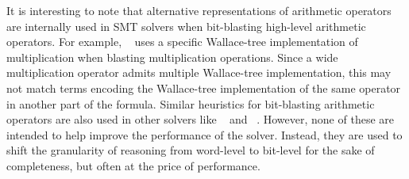 It is interesting to note that alternative representations of
arithmetic operators are internally used in SMT solvers when
bit-blasting high-level arithmetic operators.  %
For example,
{\zthree}~\cite{zthree} uses a specific Wallace-tree implementation of
multiplication when blasting multiplication operations.  Since a wide
multiplication operator admits multiple Wallace-tree implementation,
this may not match terms encoding the Wallace-tree implementation of
the same operator in another part of the formula.  Similar heuristics
for bit-blasting arithmetic operators are also used in other solvers
like {\boolector}~\cite{boolector} and {\cvcfour}~\cite{cvcfour}.
However, none of these are intended to help improve the performance
of the solver. %
Instead, they are used to shift the granularity of reasoning from
word-level to bit-level for the sake of completeness, but often
at the price of performance.



